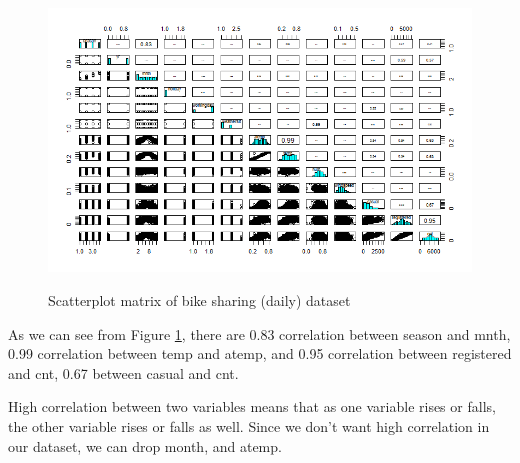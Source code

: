\documentclass[12pt]{article}
\begin{document}
\begin{figure}[H]
	\includegraphics[scale=0.6]{figures/scatterplot.png}
	\label{fig:scatterplot}
	\caption{Scatterplot matrix of bike sharing (daily) dataset}
\end{figure}

As we can see from Figure \ref{fig:scatterplot}, there are 0.83 correlation between season and mnth, 0.99 correlation between temp and atemp, and 0.95 correlation between registered and cnt, 0.67 between casual and cnt.

High correlation between two variables means that as one variable rises or falls, the other variable rises or falls as well. Since we don't want high correlation in our dataset, we can drop month, and atemp.
\end{document}
